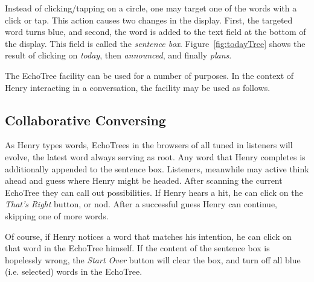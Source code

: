\documentclass{sigchi}
\begin{document}
Instead of clicking/tapping on a circle, one may target one of the
words with a click or tap. This action causes two changes in the
display. First, the targeted word turns blue, and second, the word is
added to the text field at the bottom of the display. This field is
called the {\em sentence box}. Figure~\ref{fig:todayTree} shows the
result of clicking on {\em today}, then {\em announced}, and finally
{\em plans}.

The EchoTree facility can be used for a number of purposes. In the
context of Henry interacting in a conversation, the facility may be
used as follows. 

\subsection{Collaborative Conversing}

As Henry types words, EchoTrees in the browsers of all tuned in
listeners will evolve, the latest word always serving as root. Any
word that Henry completes is additionally appended to the sentence
box. Listeners, meanwhile may active think ahead and guess where Henry
might be headed. After scanning the current EchoTree they can call out
possibilities. If Henry hears a hit, he can click on the {\em That's
  Right} button, or nod. After a successful guess Henry can continue,
skipping one of more words.

Of course, if Henry notices a word that matches his intention, he can
click on that word in the EchoTree himself. If the content of the
sentence box is hopelessly wrong, the {\em Start Over} button will
clear the box, and turn off all blue (i.e. selected) words in the
EchoTree. 
\end{document}
